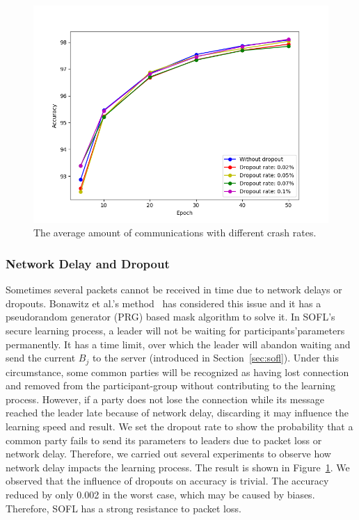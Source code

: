 \begin{figure}[!ht]
    \centering
    \includegraphics[width=\columnwidth]{img/dropout-acc.png}
    \caption{The average amount of communications with different crash rates.}
    \label{dropout-acc}
\end{figure}

\subsubsection{Network Delay and Dropout}
Sometimes several packets cannot be received in time due to network delays or dropouts. Bonawitz et al.'s method~\cite{Practical} has considered this issue and it has a pseudorandom generator (PRG) based mask algorithm to solve it. In SOFL's secure learning process, a leader will not be waiting for participants'parameters permanently. It has a time limit, over which the leader will abandon waiting and send the current $B_j$ to the server (introduced in Section~\ref{sec:sofl}). Under this circumstance, some common parties will be recognized as having lost connection and removed from the participant-group without contributing to the learning process. However, if a party does not lose the connection while its message reached the leader late because of network delay, discarding it may influence the learning speed and result. We set the dropout rate to show the probability that a common party fails to send its parameters to leaders due to packet loss or network delay. Therefore, we carried out several experiments to observe how network delay impacts the learning process. The result is shown in Figure~\ref{dropout-acc}. We observed that the influence of dropouts on accuracy is trivial. The accuracy reduced by only 0.002 in the worst case, which may be caused by biases. Therefore, SOFL has a strong resistance to packet loss. 